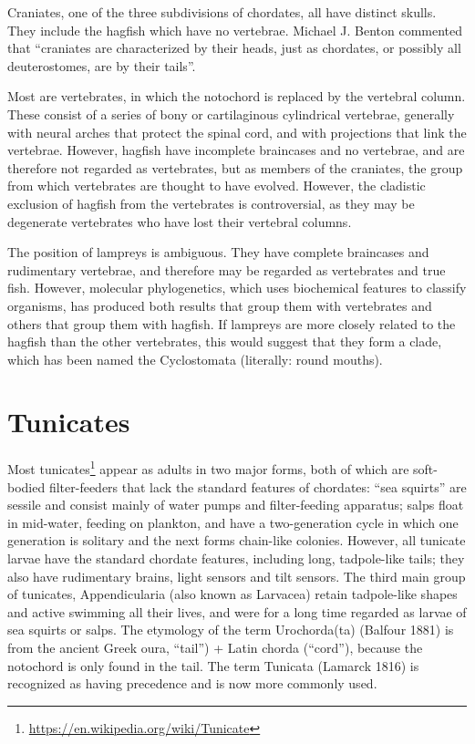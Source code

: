 \documentclass[]{book}
\let\rmarkdownfootnote\footnote%
\def\footnote{\protect\rmarkdownfootnote}
\renewcommand{\href}[2]{#2\footnote{\url{#1}}}
\begin{document}
Craniates, one of the three subdivisions of chordates, all have distinct skulls. They include the hagfish which have no vertebrae. Michael J. Benton commented that ``craniates are characterized by their heads, just as chordates, or possibly all deuterostomes, are by their tails''.

Most are vertebrates, in which the notochord is replaced by the vertebral column. These consist of a series of bony or cartilaginous cylindrical vertebrae, generally with neural arches that protect the spinal cord, and with projections that link the vertebrae. However, hagfish have incomplete braincases and no vertebrae, and are therefore not regarded as vertebrates, but as members of the craniates, the group from which vertebrates are thought to have evolved. However, the cladistic exclusion of hagfish from the vertebrates is controversial, as they may be degenerate vertebrates who have lost their vertebral columns.

The position of lampreys is ambiguous. They have complete braincases and rudimentary vertebrae, and therefore may be regarded as vertebrates and true fish. However, molecular phylogenetics, which uses biochemical features to classify organisms, has produced both results that group them with vertebrates and others that group them with hagfish. If lampreys are more closely related to the hagfish than the other vertebrates, this would suggest that they form a clade, which has been named the Cyclostomata (literally: round mouths).

\hypertarget{tunicates}{%
\section{Tunicates}\label{tunicates}}

Most \href{https://en.wikipedia.org/wiki/Tunicate}{tunicates} appear as adults in two major forms, both of which are soft-bodied filter-feeders that lack the standard features of chordates: ``sea squirts'' are sessile and consist mainly of water pumps and filter-feeding apparatus; salps float in mid-water, feeding on plankton, and have a two-generation cycle in which one generation is solitary and the next forms chain-like colonies. However, all tunicate larvae have the standard chordate features, including long, tadpole-like tails; they also have rudimentary brains, light sensors and tilt sensors. The third main group of tunicates, Appendicularia (also known as Larvacea) retain tadpole-like shapes and active swimming all their lives, and were for a long time regarded as larvae of sea squirts or salps. The etymology of the term Urochorda(ta) (Balfour 1881) is from the ancient Greek oura, ``tail'') + Latin chorda (``cord''), because the notochord is only found in the tail. The term Tunicata (Lamarck 1816) is recognized as having precedence and is now more commonly used.
\end{document}
